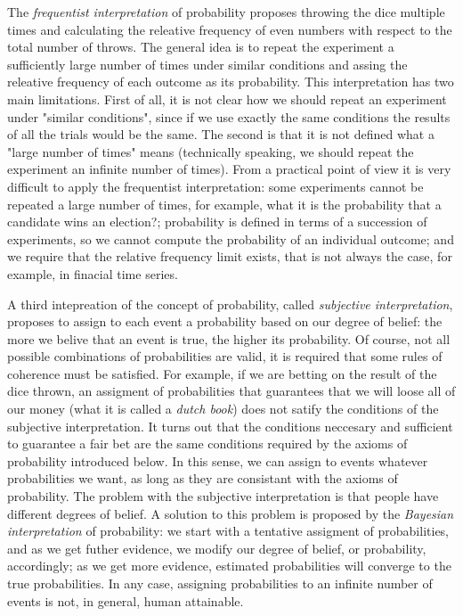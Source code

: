 The \emph{frequentist interpretation} of probability proposes throwing the dice multiple times and calculating the releative frequency of even numbers with respect to the total number of throws. The general idea is to repeat the experiment a sufficiently large number of times under similar conditions and assing the releative frequency of each outcome as its probability. This interpretation has two main limitations. First of all, it is not clear how we should repeat an experiment under "similar conditions", since if we use exactly the same conditions the results of all the trials would be the same. The second is that it is not defined what a "large number of times" means (technically speaking, we should repeat the experiment an infinite number of times). From a practical point of view it is very difficult to apply the frequentist interpretation: some experiments cannot be repeated a large number of times, for example, what it is the probability that a candidate wins an election?; probability is defined in terms of a succession of experiments, so we cannot compute the probability of an individual outcome; and we require that the relative frequency limit exists, that is not always the case, for example, in finacial time series.

A third intepreation of the concept of probability, called \emph{subjective interpretation}, proposes to assign to each event a probability based on our degree of belief: the more we belive that an event is true, the higher its probability. Of course, not all possible combinations of probabilities are valid, it is required that some rules of coherence must be satisfied. For example, if we are betting on the result of the dice thrown, an assigment of probabilities that guarantees that we will loose all of our money (what it is called a \emph{dutch book}) does not satify the conditions of the subjective interpretation. It turns out that the conditions neccesary and sufficient to guarantee a fair bet are the same conditions required by the axioms of probability introduced below. In this sense, we can assign to events whatever probabilities we want, as long as they are consistant with the axioms of probability. The problem with the subjective interpretation is that people have different degrees of belief. A solution to this problem is proposed by the \emph{Bayesian interpretation} of probability: we start with a tentative assigment of probabilities, and as we get futher evidence, we modify our degree of belief, or probability, accordingly; as we get more evidence, estimated probabilities will converge to the true probabilities. In any case, assigning probabilities to an infinite number of events is not, in general, human attainable. 

